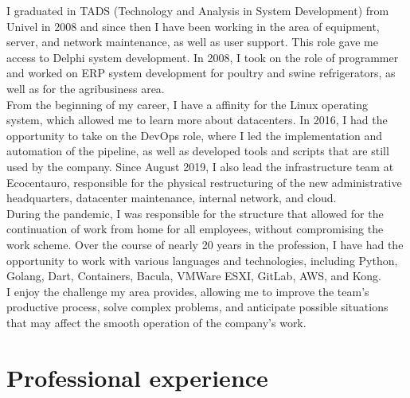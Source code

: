 \documentclass[11pt,a4paper]{moderncv}              %
\begin{document}
\makecvtitle

\small
{
    I graduated in TADS (Technology and Analysis in System Development) from Univel in 2008 and since then I have been working in the area of equipment, 
    server, and network maintenance, as well as user support. This role gave me access to Delphi system development. 
    In 2008, I took on the role of programmer and worked on ERP system development for poultry and swine refrigerators, as well as for the agribusiness area.\\

    From the beginning of my career, I have a affinity for the Linux operating system, which allowed me to learn more about datacenters. 
    In 2016, I had the opportunity to take on the DevOps role, where I led the implementation and automation of the pipeline, 
    as well as developed tools and scripts that are still used by the company. Since August 2019, I also lead the infrastructure team at Ecocentauro, 
    responsible for the physical restructuring of the new administrative headquarters, datacenter maintenance, internal network, and cloud.\\

    During the pandemic, I was responsible for the structure that allowed for the continuation of work from home for all employees, 
    without compromising the work scheme. Over the course of nearly 20 years in the profession, I have had the opportunity to work with various languages and technologies, 
    including Python, Golang, Dart, Containers, Bacula, VMWare ESXI, GitLab, AWS, and Kong.\\

    I enjoy the challenge my area provides, allowing me to improve the team's productive process, solve complex problems, 
    and anticipate possible situations that may affect the smooth operation of the company's work.
}

\vspace{6pt}
\section{Professional experience}
\end{document}
